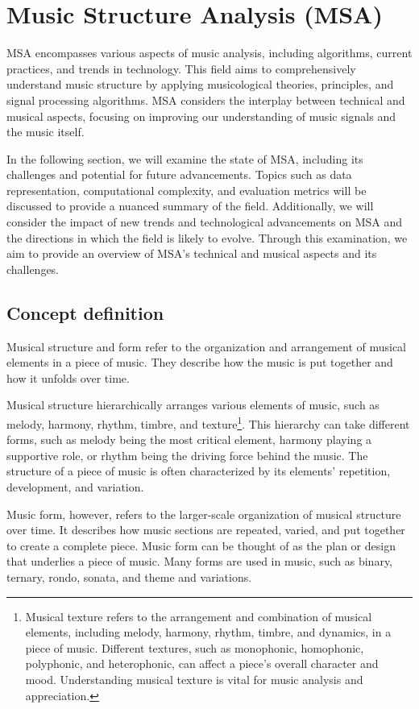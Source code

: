 \chapter{Music Structure Analysis (MSA)}

MSA encompasses various aspects of music analysis, including algorithms, current practices, and trends in technology. This field aims to comprehensively understand music structure by applying musicological theories, principles, and signal processing algorithms. MSA considers the interplay between technical and musical aspects, focusing on improving our understanding of music signals and the music itself.

In the following section, we will examine the state of MSA, including its challenges and potential for future advancements. Topics such as data representation, computational complexity, and evaluation metrics will be discussed to provide a nuanced summary of the field. Additionally, we will consider the impact of new trends and technological advancements on MSA and the directions in which the field is likely to evolve. Through this examination, we aim to provide an overview of MSA's technical and musical aspects and its challenges.

\section{Concept definition}

Musical structure and form refer to the organization and arrangement of musical elements in a piece of music. They describe how the music is put together and how it unfolds over time.

Musical structure hierarchically arranges various elements of music, such as melody, harmony, rhythm, timbre, and texture\footnote{Musical texture refers to the arrangement and combination of musical elements, including melody, harmony, rhythm, timbre, and dynamics, in a piece of music. Different textures, such as monophonic, homophonic, polyphonic, and heterophonic, can affect a piece's overall character and mood. Understanding musical texture is vital for music analysis and appreciation.}. This hierarchy can take different forms, such as melody being the most critical element, harmony playing a supportive role, or rhythm being the driving force behind the music. The structure of a piece of music is often characterized by its elements' repetition, development, and variation.

Music form, however, refers to the larger-scale organization of musical structure over time. It describes how music sections are repeated, varied, and put together to create a complete piece. Music form can be thought of as the plan or design that underlies a piece of music. Many forms are used in music, such as binary, ternary, rondo, sonata, and theme and variations.

